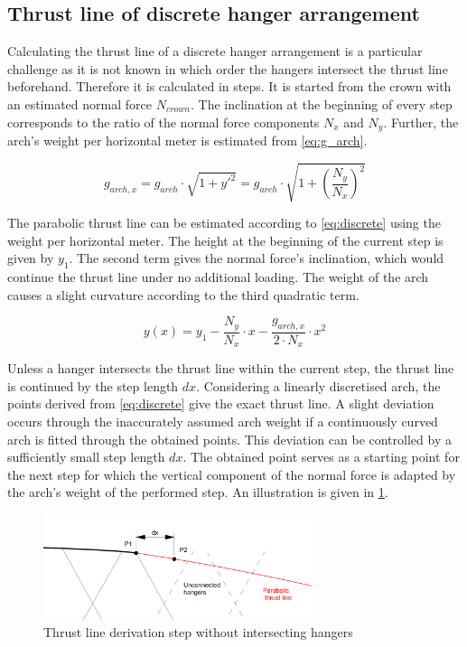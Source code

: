 \subsection{Thrust line of discrete hanger arrangement} \label{sec:discrete}

Calculating the thrust line of a discrete hanger arrangement is a particular challenge as it is not known in which order the hangers intersect the thrust line beforehand. Therefore it is calculated in steps. It is started from the crown with an estimated normal force $N_{crown}$. The inclination at the beginning of every step corresponds to the ratio of the normal force components $N_x$ and $N_y$. Further, the arch's weight per horizontal meter is estimated from \cref{eq:g_arch}.

\begin{equation}
    g_{arch,x} = g_{arch} \cdot \sqrt{1+y'^2} = g_{arch} \cdot \sqrt{1+\left( \frac{N_{y}}{N_{x}} \right)^2}
    \label{eq:g_arch}
\end{equation}

The parabolic thrust line can be estimated according to \cref{eq:discrete} using the weight per horizontal meter. The height at the beginning of the current step is given by $y_1$. The second term gives the normal force's inclination, which would continue the thrust line under no additional loading. The weight of the arch causes a slight curvature according to the third quadratic term.

\begin{equation}
    y(x) = y_1 - \frac{N_y}{N_x} \cdot x - \frac{g_{arch,x}}{2\cdot N_x}\cdot x^2
    \label{eq:discrete}
\end{equation}

Unless a hanger intersects the thrust line within the current step, the thrust line is continued by the step length $dx$. Considering a linearly discretised arch, the points derived from \cref{eq:discrete} give the exact thrust line. A slight deviation occurs through the inaccurately assumed arch weight if a continuously curved arch is fitted through the obtained points. This deviation can be controlled by a sufficiently small step length $dx$. The obtained point serves as a starting point for the next step for which the vertical component of the normal force is adapted by the arch's weight of the performed step. An illustration is given in \cref{fig:discrete_1}.

\begin{figure}[H]
    \centering
    \includegraphics[width=0.7\textwidth]{overleaf/Appendix/Pictures/discrete_thrust_line_1.PNG}
    \caption{Thrust line derivation step without intersecting hangers}
    \label{fig:discrete_1}
\end{figure}


